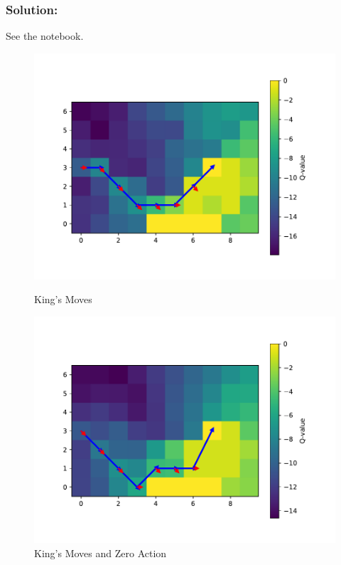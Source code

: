 \subsubsection*{Solution:}
See the notebook.
\begin{figure}[H]
    \centering
    \begin{minipage}[b]{0.47\textwidth}
      \centering
      \includegraphics[width=\textwidth]{chapters_latex/figures/ex_06_09_king_moves.pdf}
      \captionsetup{labelformat=empty}
      \caption{King's Moves}
      
    \end{minipage}
    \hspace{0.04\textwidth} %
    \begin{minipage}[b]{0.47\textwidth}
        \centering
        \includegraphics[width=\textwidth]{chapters_latex/figures/ex_06_09_king_moves_plus_zero.pdf}
        \captionsetup{labelformat=empty}
        \caption{King's Moves and Zero Action}
    \end{minipage}
  \end{figure}

